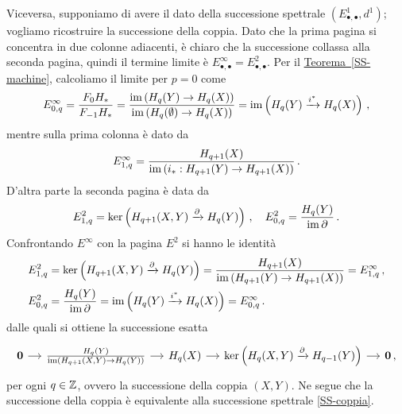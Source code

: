 \begin{ex}
	Viceversa, supponiamo di avere il dato della successione spettrale
	$(E^{1}_{\bullet, \bullet}, d^{1})$;
	vogliamo ricostruire la successione della coppia.
	Dato che la prima pagina si concentra in due
	colonne adiacenti, è chiaro che la successione 
	collassa alla seconda pagina,
	quindi il termine limite è $E^{\infty}_{\bullet,\bullet} = E^{2}_{\bullet,\bullet}$.
	Per il \hyperref[SS-machine]{Teorema~\ref{SS-machine}},
	calcoliamo il limite per $p=0$ come
	\begin{equation*}
		E^{\infty}_{0,q} = \frac{F_{0}H_{*}}{F_{-1}H_{*}}
		= \frac{\operatorname{im} \left( H_{q}(Y) \to H_{q}(X) \right)}{\operatorname{im} \left( H_{q}(\emptyset) \to H_{q}(X) \right)}
		= \operatorname{im} \left(H_{q}(Y) \xrightarrow{i^{*}} H_{q}(X) \right)\,,
	\end{equation*}
	mentre sulla prima colonna è dato da
	\begin{equation*}
		E^{\infty}_{1,q} = \frac{H_{q+1}(X)}{\operatorname{im} \left( i_{*}: H_{q+1}(Y) \to H_{q+1}(X) \right)}\,.
	\end{equation*}
	D'altra parte la seconda pagina è data da
	\begin{align*}
		E^{2}_{1,q} 
		= \ker \left( H_{q+1}(X,Y) \xrightarrow{\partial} H_{q}(Y) \right) \,, \quad
		E^{2}_{0,q} 
		= \frac{H_{q}(Y)}{\operatorname{im} \partial} \,.
	\end{align*}
	Confrontando $E^{\infty}$ con la pagina $E^{2}$ si hanno le identità
	\begin{align*}
		E^{2}_{1,q} 
		&= \ker \left( H_{q+1}(X,Y) \xrightarrow{\partial} H_{q}(Y) \right) 
		= \frac{H_{q+1}(X)}{\operatorname{im} \left(  H_{q+1}(Y) \to H_{q+1}(X) \right)}
		= E^{\infty}_{1,q}\,, \\
		E^{2}_{0,q} 
		&= \frac{H_{q}(Y)}{\operatorname{im} \partial} 
		= \operatorname{im} \left(  H_{q}(Y) \xrightarrow{i^{*}} H_{q}(X) \right)
		= E^{\infty}_{0,q}\,.
	\end{align*}
	dalle quali si ottiene la successione esatta
	\begin{equation*}
		\begin{tikzcd}[column sep=small]
			\cat{0} \ar[r]
			& \frac{H_{q}(Y)}{\im \left(  H_{q+1}(X,Y) \to H_{q}(Y) \right)} \ar[r]
			& H_{q}(X) \ar[r]
			&  \ker \left( H_{q}(X,Y) \xrightarrow{\de} H_{q-1}(Y) \right) \ar[r]
			& \cat{0}\,,
		\end{tikzcd}
	\end{equation*}
	per ogni $q \in {\mathbb Z}$, 
	ovvero la successione della coppia $(X,Y)$.
	Ne segue che la successione della coppia è equivalente alla successione spettrale
	\eqref{SS-coppia}.
\end{ex}





